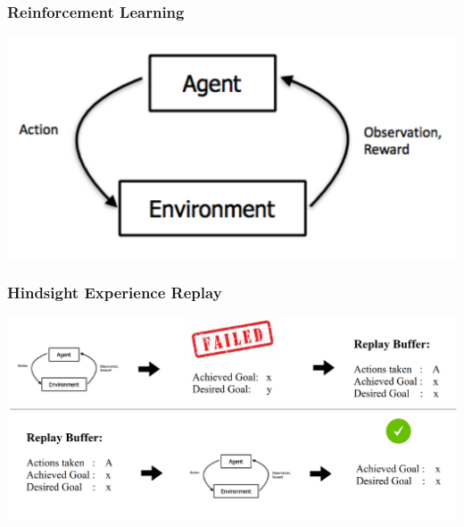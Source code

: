 





\begin{frame}
	\frametitle{Reinforcement Learning}	
	\vspace{1cm}

    \includegraphics[width=\textwidth, height=.55\textheight]{./Ressourcen/Figures/reinforcementlearning.pdf}%

\end{frame}
\clearpage






\begin{frame}
	\frametitle{Hindsight Experience Replay}	
	\vspace{1cm}
	
	\includegraphics[width=\textwidth, height=.55\textheight]{./Ressourcen/Figures/her2.pdf}%
	
\end{frame}
\clearpage

